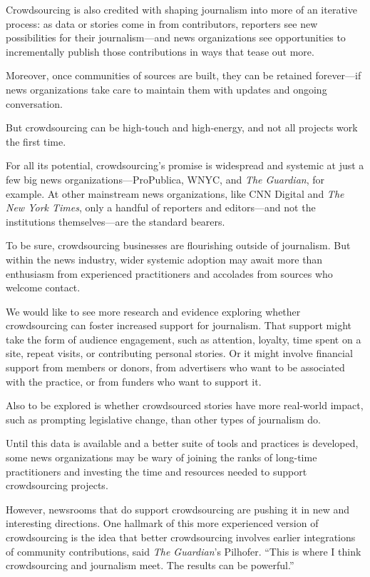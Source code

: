 \documentclass[notoc, symmetric, nobib, nols]{towcenter-guideto-book}
\begin{document}
Crowdsourcing is also credited with shaping journalism into more of an iterative process: as data or stories come in from contributors, reporters see new possibilities for their journalism---and news organizations see opportunities to incrementally publish those contributions in ways that tease out more. 

Moreover, once communities of sources are built, they can be retained forever---if news organizations take care to maintain them with updates and ongoing conversation.

But crowdsourcing can be high-touch and high-energy, and not all projects work the first time. 

For all its potential, crowdsourcing's promise is widespread and systemic at just a few big news organizations---ProPublica, WNYC, and \textit{The Guardian}, for example. At other mainstream news organizations, like CNN Digital and \textit{The New York Times}, only a handful of reporters and editors---and not the institutions themselves---are the standard bearers. 

To be sure, crowdsourcing businesses are flourishing outside of journalism. But within the news industry, wider systemic adoption may await more than enthusiasm from experienced practitioners and accolades from sources who welcome contact.  

We would like to see more research and evidence exploring whether crowdsourcing can foster increased support for journalism. That support might take the form of audience engagement, such as attention, loyalty, time spent on a site, repeat visits, or contributing personal stories. Or it might involve financial support from members or donors, from advertisers who want to be associated with the practice, or from funders who want to support it. 

Also to be explored is whether crowdsourced stories have more real-world impact, such as prompting legislative change, than other types of journalism do. 

Until this data is available and a better suite of tools and practices is developed, some news organizations may be wary of joining the ranks of long-time practitioners and investing the time and resources needed to support crowdsourcing projects.

However, newsrooms that do support crowdsourcing are pushing it in new and interesting directions. One hallmark of this more experienced version of crowdsourcing is the idea that better crowdsourcing involves earlier integrations of community contributions, said \textit{The Guardian}'s Pilhofer. ``This is where I think crowdsourcing and journalism meet. The results can be powerful.''
\end{document}
